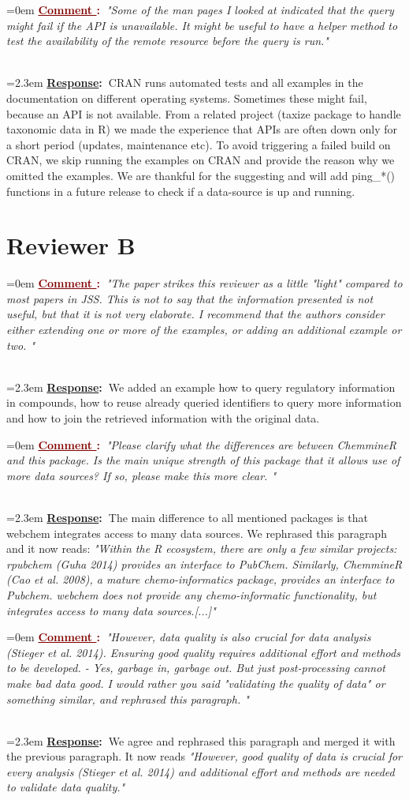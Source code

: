 \documentclass[12pt]{article}
\newcounter{cN}
\newcommand{\comment}[1]{
	\vspace{2em} 
	\refstepcounter{cN} %
	\noindent \hangindent=0em \textbf{\textcolor{Maroon}{\uline{Comment \thecN}:~}}\emph{"#1"}
	}
\newcommand{\response}[1]{
	\\[0.25em] 
	\hangindent=2.3em \textbf{\textcolor{NavyBlue}{\uline{Response}:~}}#1 
	}
\begin{document}
\comment{Some of the man pages I looked at indicated that the query might fail if the API is unavailable. It might be useful to have a helper method to test the availability of the remote resource before the query is run.}
\response{CRAN runs automated tests and all examples in the documentation on different operating systems. Sometimes these might fail, because an API is not available. From a related project (taxize package to handle taxonomic data in R) we made the experience that APIs are often down only for a short period (updates, maintenance etc). To avoid triggering a failed build on CRAN, we skip running the examples on CRAN and provide the reason why we omitted the examples.
We are thankful for the suggesting and will add ping\_*() functions in a future release to check if a data-source is up and running. 
}


\section{Reviewer B}

\comment{The paper strikes this reviewer as a little "light" compared to most papers
in JSS. This is not to say that the information presented is not useful, but
that it is not very elaborate. I recommend that the authors consider either
extending one or more of the examples, or adding an additional example or two.
}
\response{We added an example how to query regulatory information in compounds, how to reuse already queried identifiers to query more information and how to join the retrieved information with the original data.}

\comment{Please clarify what the differences are between ChemmineR and this package.
Is the main unique strength of this package that it allows use of more data
sources? If so, please make this more clear. }
\response{The main difference to all mentioned packages is that webchem integrates access to many data sources. We rephrased this paragraph and it now reads: \emph{"Within the R ecosystem, there are only a few similar projects: rpubchem (Guha 2014) provides an interface to PubChem. 
Similarly, ChemmineR (Cao et al. 2008), a mature chemo-informatics package, provides an interface to Pubchem. 
webchem does not provide any chemo-informatic functionality, but integrates access to many data sources.[...]"}
}

\comment{However, data quality is also crucial for data analysis (Stieger et
al. 2014). Ensuring good quality requires additional effort and
methods to be developed.  - Yes, garbage in, garbage out. But just post-processing cannot make bad data
good. I would rather you said "validating the quality of
data" or something similar, and rephrased this paragraph. }
\response{We agree and rephrased this paragraph and merged it with the previous paragraph. It now reads \emph{"However, good quality of data is crucial for every analysis (Stieger et al. 2014) and additional effort and methods are needed to validate data quality."}}
\end{document}
